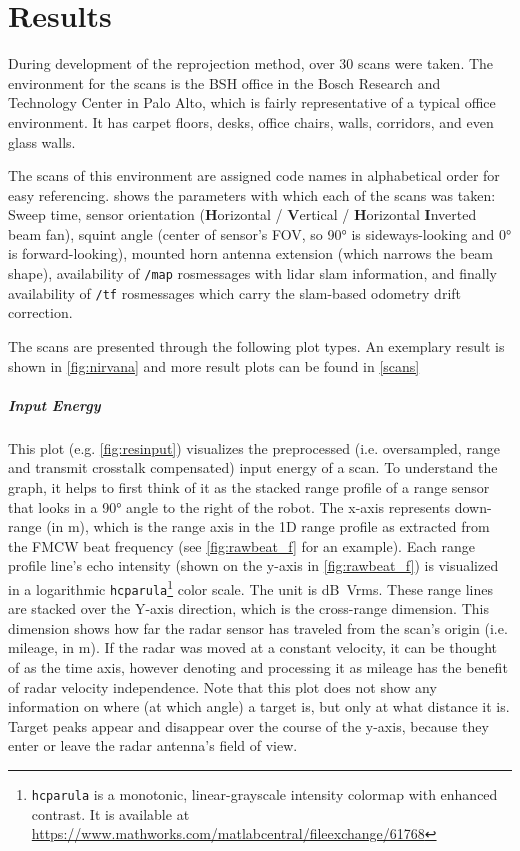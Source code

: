 \section{Results}\label{results}

During development of the reprojection method, over 30 scans were taken. The environment for the scans is the BSH office in the Bosch Research and Technology Center in Palo Alto, which is fairly representative of a typical office environment. It has carpet floors, desks, office chairs, walls, corridors, and even glass walls.

The scans of this environment are assigned code names in alphabetical order for easy referencing.  shows the parameters with which each of the scans was taken: Sweep time, sensor orientation (\textbf{H}orizontal / \textbf{V}ertical / \textbf{H}orizontal \textbf{I}nverted beam fan), squint angle (center of sensor's FOV, so \ang{90} is sideways-looking and \ang{0} is forward-looking), mounted horn antenna extension (which narrows the beam shape), availability of \texttt{/map} rosmessages with lidar slam information, and finally availability of \texttt{/tf} rosmessages which carry the slam-based odometry drift correction.

The scans are presented through the following plot types. An exemplary result is shown in \cref{fig:nirvana} and more result plots can be found in \cref{scans}

\subparagraph{Input Energy}
This plot (e.g. \cref{fig:resinput}) visualizes the preprocessed (i.e. oversampled, range and transmit crosstalk compensated) input energy of a scan. To understand the graph, it helps to first think of it as the stacked range profile of a range sensor that looks in a \ang{90} angle to the right of the robot. The x-axis represents down-range (in \si{m}), which is the range axis in the 1D range profile as extracted from the FMCW beat frequency (see \cref{fig:rawbeat_f} for an example). Each range profile line's echo intensity (shown on the y-axis in \cref{fig:rawbeat_f}) is visualized in a logarithmic \texttt{hcparula}\footnote{\texttt{hcparula} is a monotonic, linear-grayscale intensity colormap with enhanced contrast. It is available at \url{https://www.mathworks.com/matlabcentral/fileexchange/61768}} color scale. The unit is \si{dB Vrms}. These range lines are stacked over the Y-axis direction, which is the cross-range dimension. This dimension shows how far the radar sensor has traveled from the scan's origin (i.e. mileage, in \si{m}). If the radar was moved at a constant velocity, it can be thought of as the time axis, however denoting and processing it as mileage has the benefit of radar velocity independence. Note that this plot does not show any information on where (at which angle) a target is, but only at what distance it is. Target peaks appear and disappear over the course of the y-axis, because they enter or leave the radar antenna's field of view.

